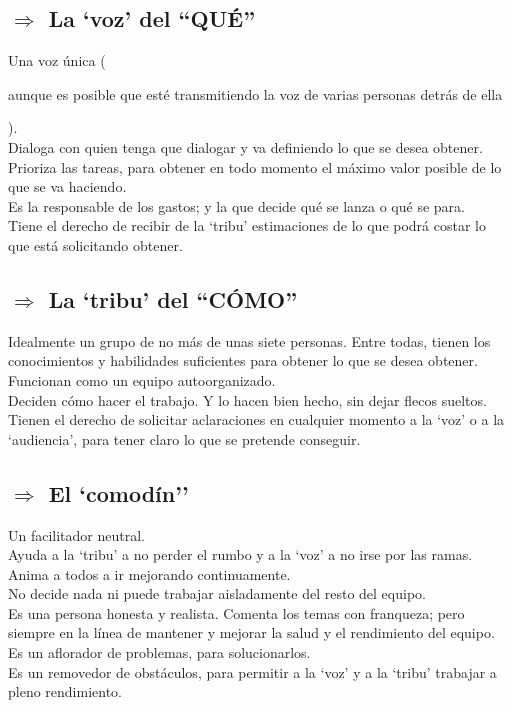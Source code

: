 \documentclass[12pt,a4paper]{article}
\author{Juan Murua Olalde}
\begin{document}
\subsection*{$\Rightarrow$ La `voz' del ``QUÉ''}
Una voz única (\begin{footnotesize}aunque es posible que esté transmitiendo la voz de varias personas detrás de ella\end{footnotesize}).
\\Dialoga con quien tenga que dialogar y va definiendo lo que se desea obtener.
\\Prioriza las tareas, para obtener en todo momento el máximo valor posible de lo que se va haciendo.
\\Es la responsable de los gastos; y la que decide qué se lanza o qué se para.
\\Tiene el derecho de recibir de la `tribu' estimaciones de lo que podrá costar lo que está solicitando obtener.

\subsection*{$\Rightarrow$ La `tribu' del ``CÓMO''}
Idealmente un grupo de no más de unas siete personas. Entre todas, tienen los conocimientos y habilidades suficientes para obtener lo que se desea obtener. Funcionan como un equipo autoorganizado.
\\Deciden cómo hacer el trabajo. Y lo hacen bien hecho, sin dejar flecos sueltos.
\\Tienen el derecho de solicitar aclaraciones en cualquier momento a la `voz' o a la `audiencia', para tener claro lo que se pretende conseguir.

\subsection*{$\Rightarrow$ El `comodín''}
Un facilitador neutral.
\\Ayuda a la `tribu' a no perder el rumbo y a la `voz' a no irse por las ramas.
\\ Anima a todos a ir mejorando continuamente.
\\No decide nada ni puede trabajar aisladamente del resto del equipo.
\\Es una persona honesta y realista. Comenta los temas con franqueza; pero siempre en la línea de mantener y mejorar la salud y el rendimiento del equipo.
\\Es un aflorador de problemas, para solucionarlos.
\\Es un removedor de obstáculos, para permitir a la `voz' y a la `tribu' trabajar a pleno rendimiento.
\end{document}
